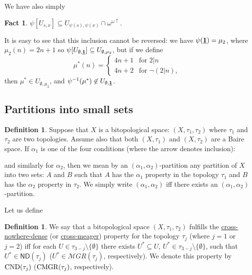\documentclass[12pt]{amsart}
\theoremstyle{plain}
\newtheorem{fact}[theorem]{Fact}
\theoremstyle{definition}
\newtheorem{definition}[theorem]{Definition}
\theoremstyle{remark}
\newcommand{\incrbaire}{\omega^{\omega \uparrow}}
\newcommand{\inversepsi}{\psi^{-1}}
\newcommand{\meager}{{\mathcal MGR}}
\newcommand{\ND}{\mathsf{ND}}
\newcommand{\Hechler}[2]{U_{#1,#2}}
\newcommand{\ffid}{\inversepsi}
\newcommand{\sequenceOnes}{\underline{\bf 1}}
\newcommand{\PiqueProperty}[2]{\mathrm{C%
\ifcase#1
ND%
\or MGR%
\else ND%
\fi
}(\tau_{#2})}
\begin{document}
We have also simply 
\begin{fact}\label{fact:inclusion}
$\psi[\Hechler{s}{x}] \subseteq \Hechler{\psi(s)}{\psi(x)} \cap \incrbaire$.
\end{fact}
It is easy to see that this inclusion cannot be reversed: we have
$\psi(\sequenceOnes) = \mu_2$, where
$\mu_2(n) = 2n+1$ so
$\psi[\Hechler{\emptyset}{\sequenceOnes}] \subseteq \Hechler{\emptyset}{\mu_2}$,
but if we define 
\[
\mu^*(n) =
\begin{cases}
4n + 1 & \text{for } 2 | n\\
4n + 2 & \text{for } \neg(2|n),
\end{cases}
\]
then $\mu^* \in \Hechler{\emptyset}{\mu_2}$,
and
$\ffid(\mu^*) \not\in \Hechler{\emptyset}{\sequenceOnes}$.

\subsection{Partitions into small sets}

\begin{definition}\label{definition:partition-property}
Suppose that $X$ is a bitopological space:
$(X, \tau_1, \tau_2)$ where $\tau_1$ and $\tau_2$ are two topologies.
Assume also that both $(X, \tau_1)$ and $(X, \tau_2)$ are a Baire
space. If $\alpha_1$ is one of the four conditions (where the arrow denotes inclusion):

and similarly for $\alpha_2$, then
we mean by an $(\alpha_1, \alpha_2)$-partition any partition
of $X$ into two sets: $A$ and $B$ such that $A$ has the $\alpha_1$ property
in the topology $\tau_1$ and $B$ has the $\alpha_2$ property
in $\tau_2$. We simply write $(\alpha_1, \alpha_2)$ iff there
exists an $(\alpha_1, \alpha_2)$-partition.
\end{definition}

Let us define
\begin{definition}
  We say that a bitopological space $(X, \tau_1, \tau_2)$ fulfills
  the \uline{cross\allowbreak-nowhere\allowbreak-dense} (or \uline{cross-meager}) property
  for the topology $\tau_j$ (where $j = 1$ or $j = 2$)
  iff for each
  $U \in \tau_{3 - j} \setminus \lbrace \emptyset \rbrace$
  there exists $U^* \subseteq U$, $U^* \in \tau_{3 - j} \setminus \lbrace \emptyset \rbrace$,
  such that $U^* \in \ND(\tau_j)$ ($U^* \in \meager(\tau_j)$, respectively). 
  We denote this property by $\PiqueProperty{0}{j}$
  ($\PiqueProperty{1}{j}$, respectively).
\end{definition}
\end{document}
